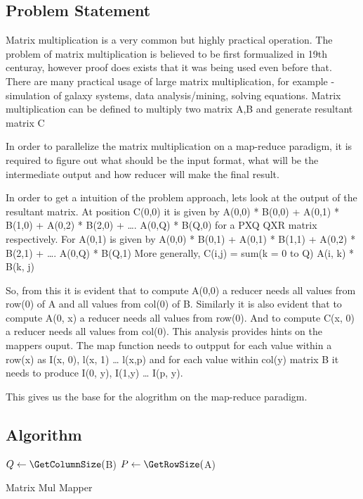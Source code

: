 \documentclass{article}
\begin{document}
\subsection{Problem Statement}
Matrix multiplication is a very common but highly practical operation. The problem of matrix multiplication is believed to be first formualized in 19th centuray, however proof does exists that it was being used even before that. There are many practical usage of large matrix multiplication, for example - simulation of galaxy systems, data analysis/mining, solving equations.
Matrix multiplication can be defined to multiply two matrix A,B and generate resultant matrix C

In order to parallelize the matrix multiplication on a map-reduce paradigm, it is required to figure out what should be the input format, what will be the intermediate output and how reducer will make the final result.

In order to get a intuition of the problem approach, lets look at the output of the resultant matrix. At position C(0,0) it is given by A(0,0) * B(0,0) + A(0,1) * B(1,0) + A(0,2) * B(2,0) + …. A(0,Q) * B(Q,0) for a PXQ QXR matrix respectively.
For A(0,1) is given by A(0,0) * B(0,1) + A(0,1) * B(1,1) + A(0,2) * B(2,1) + …. A(0,Q) * B(Q,1)
More generally, C(i,j) = sum(k = 0 to Q) { A(i, k) * B(k, j) }

So, from this it is evident that to compute A(0,0) a reducer needs all values from row(0) of A and all values from col(0) of B. Similarly it is also evident that to compute A(0, x) a reducer needs all values from row(0). And to compute C(x, 0) a reducer needs all values from col(0). This analysis provides hints on the mappers ouput.
The map function needs to outpput for each value within a row(x) as I(x, 0), l(x, 1) … l(x,p) and for each value within col(y) matrix B it needs to produce I(0, y), I(1,y) … I(p, y).

This gives us the base for the alogrithm on the map-reduce paradigm.
\subsection{Algorithm}
\IncMargin{1em}
\begin{algorithm}[H]
\DontPrintSemicolon
{}
\BlankLine
$Q\leftarrow \GetColumnSize($B)\;
$P\leftarrow \GetRowSize($A)\;
\caption{Matrix Mul Mapper\label{IR}}
\end{algorithm}
\DecMargin{1em}
\end{document}

